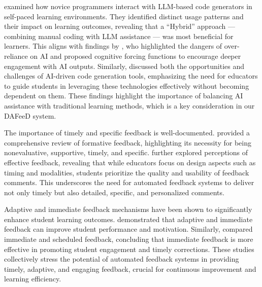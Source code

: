 \documentclass[manuscript,screen,review]{acmart}
\begin{document}
%
%
\citet{kazemitabaar:2024:HowNovicesUse} examined how novice programmers interact with LLM-based code generators in self-paced learning environments. They identified distinct usage patterns and their impact on learning outcomes, revealing that a ``Hybrid'' approach — combining manual coding with LLM assistance — was most beneficial for learners. This aligns with findings by \citet{bucinca:2021:TrustThinkCognitive}, who highlighted the dangers of over-reliance on AI and proposed cognitive forcing functions to encourage deeper engagement with AI outputs. Similarly, \citet{becker:2023:ProgrammingHardLeast} discussed both the opportunities and challenges of AI-driven code generation tools, emphasizing the need for educators to guide students in leveraging these technologies effectively without becoming dependent on them. These findings highlight the importance of balancing AI assistance with traditional learning methods, which is a key consideration in our DAFeeD system.


%
The importance of timely and specific feedback is well-documented. \citet{shute:2008:FocusFormativeFeedback} provided a comprehensive review of formative feedback, highlighting its necessity for being nonevaluative, supportive, timely, and specific. \citet{dawson:2019:WhatMakesEffective} further explored perceptions of effective feedback, revealing that while educators focus on design aspects such as timing and modalities, students prioritize the quality and usability of feedback comments. This underscores the need for automated feedback systems to deliver not only timely but also detailed, specific, and personalized comments.


%
Adaptive and immediate feedback mechanisms have been shown to significantly enhance student learning outcomes. \citet{marwan:2020:AdaptiveImmediateFeedback} demonstrated that adaptive and immediate feedback can improve student performance and motivation. Similarly, \citet{leinonen:2022:ComparisonImmediateScheduled} compared immediate and scheduled feedback, concluding that immediate feedback is more effective in promoting student engagement and timely corrections. These studies collectively stress the potential of automated feedback systems in providing timely, adaptive, and engaging feedback, crucial for continuous improvement and learning efficiency.
\end{document}
